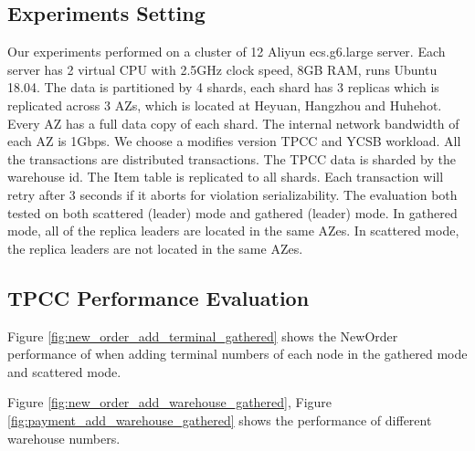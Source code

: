 \documentclass[conference]{IEEEtran}
\begin{document}
\subsection{Experiments Setting}
Our experiments performed on a cluster of 12 Aliyun ecs.g6.large server.
Each server has 2 virtual CPU with 2.5GHz clock speed, 8GB RAM, runs Ubuntu 18.04.
The data is partitioned by 4 shards, each shard has 3 replicas which is replicated across 3 AZs, which is located at Heyuan, Hangzhou and Huhehot.
Every AZ has a full data copy of each shard.
The internal network bandwidth of each AZ is 1Gbps.
We choose a modifies version TPCC and YCSB workload.
All the transactions are distributed transactions.
The TPCC data is sharded by the warehouse id.
The Item table is replicated to all shards.
Each transaction will retry after 3 seconds if it aborts for violation serializability.
The evaluation both tested on both scattered (leader) mode and gathered (leader) mode.
In gathered mode, all of the replica leaders are located in the same AZes.
In scattered mode, the replica leaders are not located in the same AZes.

\subsection{TPCC Performance Evaluation}
Figure \ref{fig:new_order_add_terminal_gathered} shows the NewOrder performance of when adding terminal numbers of each node in the gathered  mode and scattered mode.

Figure \ref{fig:new_order_add_warehouse_gathered},
Figure \ref{fig:payment_add_warehouse_gathered} shows 
the performance of different warehouse numbers.
\end{document}
